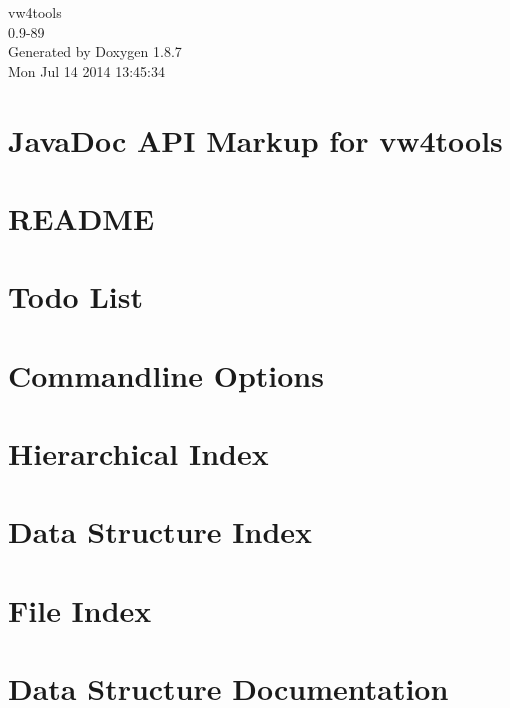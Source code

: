 \documentclass[twoside]{book}
\newcommand{\+}{\discretionary{\mbox{\scriptsize$\hookleftarrow$}}{}{}}
\newcommand{\clearemptydoublepage}{%
  \newpage{\pagestyle{empty}\cleardoublepage}%
}
\begin{document}
\begin{titlepage}
\vspace*{7cm}
\begin{center}%
{\Large vw4tools \\[1ex]\large 0.\+9-\/89 }\\
\vspace*{1cm}
{\large Generated by Doxygen 1.8.7}\\
\vspace*{0.5cm}
{\small Mon Jul 14 2014 13:45:34}\\
\end{center}
\end{titlepage}
\clearemptydoublepage
\tableofcontents
\clearemptydoublepage
{}

\chapter{Java\+Doc A\+P\+I Markup for vw4tools}
\label{index}
\chapter{R\+E\+A\+D\+M\+E}
\label{md_htdocs_README}

\chapter{Todo List}
\label{todo}

\chapter{Commandline Options}
\label{cmdopt}

\chapter{Hierarchical Index}

\chapter{Data Structure Index}

\chapter{File Index}

\chapter{Data Structure Documentation}









\end{document}
